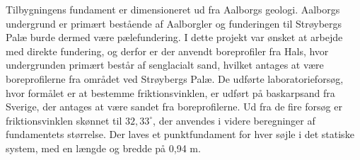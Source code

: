  \newline \indent{     }  Tilbygningens fundament er dimensioneret ud fra Aalborgs geologi. Aalborgs undergrund er primært bestående af Aalborgler og funderingen til Strøybergs Palæ burde dermed være pælefundering. I dette projekt var ønsket at arbejde med direkte fundering, og derfor er der anvendt boreprofiler fra Hals, hvor undergrunden primært består af senglacialt sand, hvilket antages at være boreprofilerne fra området ved Strøybergs Palæ.
 \newline \indent{     }  De udførte laboratorieforsøg, hvor formålet er at bestemme friktionsvinklen, er udført på baskarpsand fra Sverige, der antages at være sandet fra boreprofilerne. Ud fra de fire forsøg er friktionsvinklen skønnet til $32,33^{\circ}$, der anvendes i videre beregninger af fundamentets størrelse. Der laves et punktfundament for hver søjle i det statiske system, med en længde og bredde på 0,94 m.